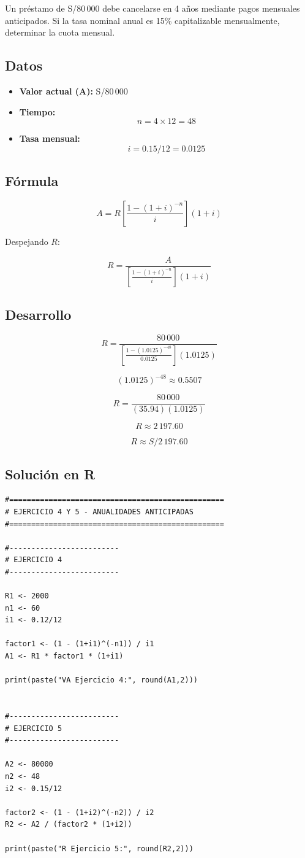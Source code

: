 \documentclass[12pt]{article}
\begin{document}
Un préstamo de S/80\,000 debe cancelarse en 4 años mediante pagos mensuales anticipados. Si la tasa nominal anual es 15\% capitalizable mensualmente, determinar la cuota mensual.

\subsection*{Datos}

\begin{itemize}
\item \textbf{Valor actual (A):} S/80\,000
\item \textbf{Tiempo:}
\[
n = 4 \times 12 = 48
\]
\item \textbf{Tasa mensual:}
\[
i = 0.15/12 = 0.0125
\]
\end{itemize}

\subsection*{Fórmula}

\[
A = R \left[\frac{1-(1+i)^{-n}}{i}\right](1+i)
\]

Despejando \(R\):

\[
R = \frac{A}{\left[\frac{1-(1+i)^{-n}}{i}\right](1+i)}
\]

\subsection*{Desarrollo}

\[
R = \frac{80\,000}{\left[\frac{1-(1.0125)^{-48}}{0.0125}\right](1.0125)}
\]

\[
(1.0125)^{-48} \approx 0.5507
\]

\[
R = \frac{80\,000}{(35.94)(1.0125)}
\]

\[
R \approx 2\,197.60
\]

\[
\boxed{R \approx S/2\,197.60}
\]

\subsection*{Solución en R}

\begin{lstlisting}
#=================================================
# EJERCICIO 4 Y 5 - ANUALIDADES ANTICIPADAS
#=================================================

#-------------------------
# EJERCICIO 4
#-------------------------

R1 <- 2000
n1 <- 60
i1 <- 0.12/12

factor1 <- (1 - (1+i1)^(-n1)) / i1
A1 <- R1 * factor1 * (1+i1)

print(paste("VA Ejercicio 4:", round(A1,2)))


#-------------------------
# EJERCICIO 5
#-------------------------

A2 <- 80000
n2 <- 48
i2 <- 0.15/12

factor2 <- (1 - (1+i2)^(-n2)) / i2
R2 <- A2 / (factor2 * (1+i2))

print(paste("R Ejercicio 5:", round(R2,2)))
\end{lstlisting}
\end{document}
